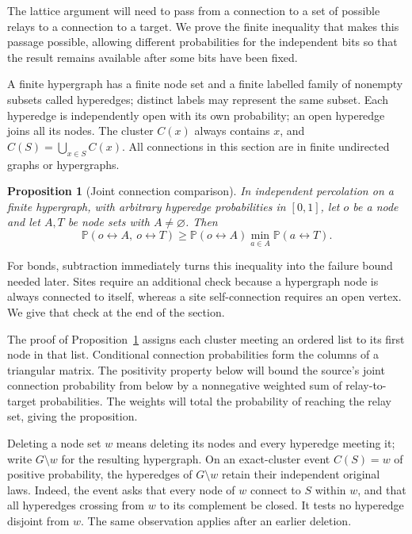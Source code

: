 \documentclass[11pt]{article}
\newtheorem{proposition}[theorem]{Proposition}
\theoremstyle{definition}
\theoremstyle{remark}
\numberwithin{equation}{section}
\begin{document}
The lattice argument will need to pass from a connection to a set of possible
relays to a connection to a target. We prove the finite inequality that makes
this passage possible, allowing different probabilities for the independent
bits so that the result remains available after some bits have been fixed.

A finite hypergraph has a finite node set and a finite labelled family of
nonempty subsets called hyperedges; distinct labels may represent the same
subset. Each hyperedge is independently open with its own probability; an
open hyperedge joins all its nodes. The cluster $C(x)$ always
contains $x$, and $C(S)=\bigcup_{x\in S}C(x)$. All connections in this section
are in finite undirected graphs or hypergraphs.

\begin{proposition}[Joint connection comparison]\label{cmp:joint}
In independent percolation on a finite hypergraph, with arbitrary hyperedge
probabilities in $[0,1]$, let $o$ be a node and let $A,T$ be node sets with
$A\ne\varnothing$. Then
\begin{equation}\label{cmp:joint-bound}
 \mathbb P(o\leftrightarrow A,\ o\leftrightarrow T)
 \ge \mathbb P(o\leftrightarrow A)
       \min_{a\in A}\mathbb P(a\leftrightarrow T).
\end{equation}
\end{proposition}

For bonds, subtraction immediately turns this inequality into the failure
bound needed later. Sites require an additional check because a hypergraph
node is always connected to itself, whereas a site self-connection requires
an open vertex. We give that check at the end of the section.

The proof of Proposition~\ref{cmp:joint} assigns each cluster meeting an
ordered list to its first node in that list. Conditional connection probabilities form the columns
of a triangular matrix. The positivity property below will bound the source's
joint connection probability from below by a nonnegative weighted sum of relay-to-target
probabilities. The weights will total the probability of reaching the relay
set, giving the proposition.

Deleting a node set $w$ means deleting its nodes and every hyperedge meeting
it; write $G\setminus w$ for the resulting hypergraph. On an exact-cluster
event $C(S)=w$ of positive probability, the hyperedges of $G\setminus w$
retain their independent original laws. Indeed, the event asks that every
node of $w$ connect to $S$ within $w$, and that all hyperedges crossing from
$w$ to its complement be closed. It tests no hyperedge disjoint from $w$.
The same observation applies after an earlier deletion.
\end{document}
